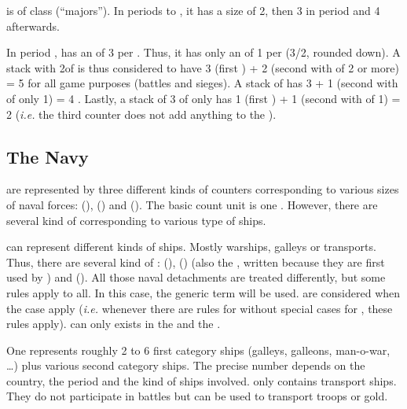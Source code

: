 \begin{exemple}
  \FRA is of class \CAIV (``majors''). In periods  to ,
  it has a size of 2, then 3 in period  and 4 afterwards.

  In period , \FRA has an  of 3 per
  \ARMY\faceplus. Thus, it has only an  of 1 per
  \ARMY\facemoins (3/2, rounded down). A stack with 2\ARMY\faceplus of \FRA is
  thus considered to have 3 (first \ARMY) + 2 (second \ARMY with
   of 2 or more) = 5  for all
  game purposes (battles and sieges). A stack of \ARMY\faceplus
  \ARMY\facemoins has 3 + 1 (second \ARMY with  of only
  1) = 4 . Lastly, a stack of 3 \ARMY\facemoins of \FRA
  only has 1 (first \ARMY) + 1 (second \ARMY with  of
  1) = 2  (\emph{i.e.}  the third \ARMY counter does
  not add anything to the ).
\end{exemple}



\subsection{The Navy}

 are represented by three different kinds of counters
corresponding to various sizes of naval forces:  (\FLEET),
 (\ND) and 
(\NDE).
\bparag The basic count unit is one \ND. However, there are several kind of
\ND corresponding to various type of ships.

 \ND can represent different kinds of
ships. Mostly warships, galleys or transports.
\bparag Thus, there are several kind of \ND: 
(\NWD),  (\NGD) (also the ,
written \VGD because they are first used by \VEN) and  (\NTD).
\bparag All those naval detachments are treated differently, but some rules
apply to all. In this case, the generic term \ND will be used.
\bparag \VGD are considered \NGD when the case apply (\emph{i.e.} whenever
there are rules for \NGD without special cases for \VGD, these rules apply).
\bparag \NGD can only exists in the \regionMediterrannee and the
\regionBaltique.

\aparag[Detachments.] One \ND represents roughly 2 to 6 first category ships
(galleys, galleons, man-o-war, \ldots) plus various second category ships. The
precise number depends on the country, the period and the kind of ships
involved.
\bparag \NTD only contains transport ships. They do not participate in battles
but can be used to transport troops or gold.

